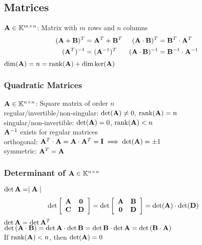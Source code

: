 \begin{mdframed}[style=eqbox]
\subsection{Matrices}
$\mathbf{A} \in \mathbb{K}^{m \times n} $: Matrix with $m$ rows and $n$ columns
\begin{align*}
  (\mathbf{A} + \mathbf{B})^T &= \mathbf{A}^T + \mathbf{B}^T & (\mathbf{A} \cdot \mathbf{B})^T &= \mathbf{B}^T \cdot \mathbf{A}^T \\
  (\mathbf{A}^T)^{-1} &= (\mathbf{A}^{ - 1})^T & (\mathbf{A} \cdot \mathbf{B})^{-1} &= \mathbf{B}^{-1} \cdot \mathbf{A}^{-1}
\end{align*}
$\dim(\mathbf{A}) = n = \text{rank}(\mathbf{A}) + \dim \text{ker}(\mathbf{A})$

\subsubsection{Quadratic Matrices}
$\mathbf{A} \in \mathbb{K}^{n \times n}$: Square matrix of order $n$\\[0.25em]
regular/invertible/non-singular: $\det(\mathbf{A}) \neq 0$, $\text{rank}(\mathbf{A}) = n$\\
singular/non-invertible: $\det(\mathbf{A}) = 0$, $\text{rank}(\mathbf{A}) < n$\\
$\mathbf{A}^{-1}$ exists for regular matrices\\[0.25em]
orthogonal: $\mathbf{A}^T \cdot \mathbf{A} = \mathbf{A} \cdot \mathbf{A}^T = \mathbf{I} \implies \det(\mathbf{A}) = \pm 1$\\[0.25em]
symmetric: $\mathbf{A}^T = \mathbf{A}$

\subsubsection{Determinant of $\mathbf{A} \in \mathbb{K}^{n \times n}$}
$\det{\mathbf{A}} = \mid \mathbf{A} \mid$
\begin{align*}
  \det \left[\begin{array}{cc}
    \mathbf{A} & \mathbf{0} \\
    \mathbf{C} & \mathbf{D}
  \end{array}\right] &= \det \left[\begin{array}{cc}
    \mathbf{A} & \mathbf{B} \\
    \mathbf{0} & \mathbf{D}
  \end{array}\right] = \det(\mathbf{A}) \cdot \det(\mathbf{D})
\end{align*}
$\det{\mathbf{A}} = \det{\mathbf{A}^T}$\\
$\det{(\mathbf{A} \cdot \mathbf{B})} = \det{\mathbf{A}} \cdot \det{\mathbf{B}} = \det{\mathbf{B}} \cdot \det{\mathbf{A}} = \det{(\mathbf{B} \cdot \mathbf{A})}$\\[0.25em]
If $\text{rank}(\mathbf{A}) < n$, then $\det(\mathbf{A}) = 0$


\end{mdframed}
